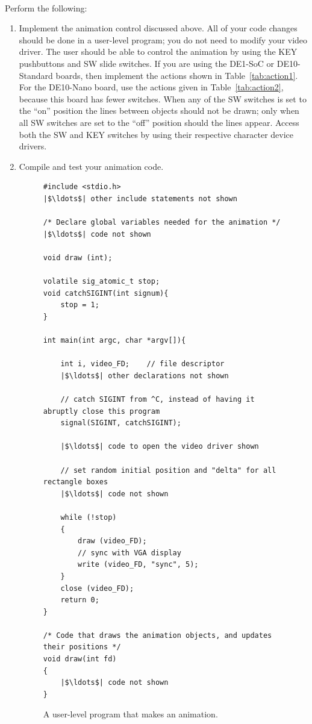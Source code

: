 \documentclass[epsfig,10pt,fullpage]{article}
\begin{document}
~\\
\noindent
Perform the following:

\begin{enumerate}
\item Implement the animation control discussed above. All of your code changes
should be done in a user-level program; you do not need to modify your video driver.
The user should be able to control the animation by using the KEY pushbuttons and SW slide
switches. If you are using the DE1-SoC or DE10-Standard boards, then implement the actions 
shown in Table~\ref{tab:action1}. For the DE10-Nano board, use the actions given in 
Table~\ref{tab:action2}, because this board has fewer switches. 
When any of the SW switches is set to the ``on'' position the lines between objects should 
not be drawn; only when all SW switches are set to the ``off'' position should the 
lines appear. Access both the SW and KEY switches by using their respective character 
device drivers. 

\item Compile and test your animation code.
\newpage
\lstset{language=C,numbers=none}
\begin{figure}[H]
\begin{center}
\begin{minipage}[t]{15 cm}
\begin{lstlisting}[name=part4]
#include <stdio.h>
|$\ldots$| other include statements not shown

/* Declare global variables needed for the animation */
|$\ldots$| code not shown

void draw (int);

volatile sig_atomic_t stop;
void catchSIGINT(int signum){
    stop = 1;
}

int main(int argc, char *argv[]){

	int i, video_FD;	// file descriptor
	|$\ldots$| other declarations not shown
    
  	// catch SIGINT from ^C, instead of having it abruptly close this program
  	signal(SIGINT, catchSIGINT);
    
	|$\ldots$| code to open the video driver shown

	// set random initial position and "delta" for all rectangle boxes
	|$\ldots$| code not shown

  	while (!stop)
	{
		draw (video_FD);
		// sync with VGA display 
		write (video_FD, "sync", 5);
	}
	close (video_FD);
	return 0;
}

/* Code that draws the animation objects, and updates their positions */
void draw(int fd)
{
	|$\ldots$| code not shown
}
\end{lstlisting}
\end{minipage}
\caption{A user-level program that makes an animation.}
\label{fig:part4}
\end{center}
\end{figure}
\end{enumerate}
\end{document}
